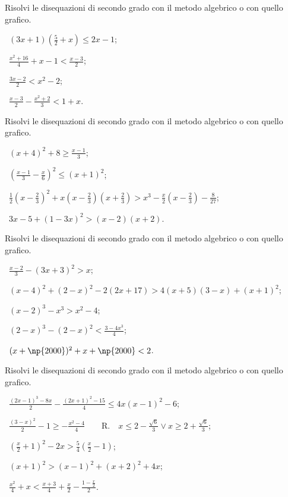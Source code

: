 \begin{esercizio}[\Ast]
 \label{ese:4.19}
Risolvi le disequazioni di secondo grado con il metodo algebrico o con quello grafico.
\begin{multicols}{2}
 \begin{enumeratea}
 \item~$(3x+1)\left(\frac 5 2+x\right)\le 2x-1$;
 \item~$\frac{x^2+16} 4+x-1<\frac{x-3} 2$;
 \item~$\frac{3x-2} 2<x^2-2$;
 \item~$\frac{x-3} 2-\frac{x^2+2} 3<1+x$.
 \end{enumeratea}
 \end{multicols}
\end{esercizio}

\begin{esercizio}[\Ast]
\label{ese:4.20}
Risolvi le disequazioni di secondo grado con il metodo algebrico o con quello grafico.
 \begin{enumeratea}
 \item~$(x+4)^2+8\ge \frac{x-1} 3$;
 \item~$\left(\frac{x-1} 3-\frac x 6\right)^2\le (x+1)^2$;
 \item~$\frac 1 2\left(x-\frac 2 3\right)^2+x\left(x-\frac 2 3\right)\left(x+\frac 2 3\right)>x^3-\frac x 2\left(x-\frac 2 3\right)-\frac 8{27}$;
 \item~$3x-5+(1-3x)^2>(x-2)(x+2)$.
 \end{enumeratea}
\end{esercizio}

\begin{esercizio}[\Ast]
\label{ese:4.21}
Risolvi le disequazioni di secondo grado con il metodo algebrico o con quello grafico.
 \begin{enumeratea}
 \item~$\frac{x-2} 3-(3x+3)^2>x$;
 \item~$(x-4)^2+(2-x)^2-2(2x+17)>4(x+5)(3-x)+(x+1)^2$;
 \item~$(x-2)^3-x^3>x^2-4$;
 \item~$(2-x)^3-(2-x)^2<\frac{3-4x^3} 4$;
 \item~$(x+\np{2000})^2+x+\np{2000}<2$.
 \end{enumeratea}
\end{esercizio}

\begin{esercizio}[\Ast]
 \label{ese:4.22}
Risolvi le disequazioni di secondo grado con il metodo algebrico o con quello grafico.
 \begin{enumeratea}
 \item~$\frac{\left(2x-1\right)^3-8x} 2-\frac{\left(2x+1\right)^2-15} 4\le 4x\left(x-1\right)^2-6$;
 \item~$\frac{(3-x)^2} 2-1\ge -\frac{x^2-4} 4$~~~~R.~~$x\le 2-\frac{\sqrt 6} 3\vee x\ge 2+\frac{\sqrt 6} 3$;
 \item~$\left(\frac x 2+1\right)^2-2x>\frac 5 4\left(\frac x 2-1\right)$;
 \item~$(x+1)^2>(x-1)^2+(x+2)^2+4x$;
 \item~$\frac{x^2} 4+x<\frac{x+3} 4+\frac x 2-\frac{1-\frac x 2} 2$.
 \end{enumeratea}
\end{esercizio}

